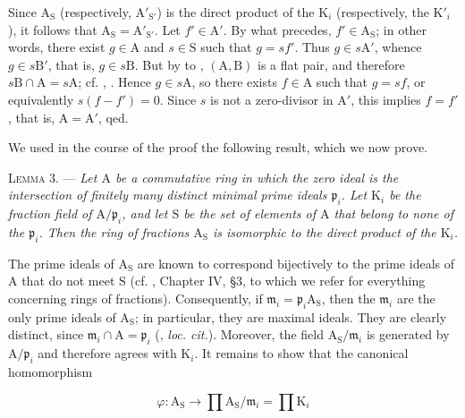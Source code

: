 Since $\mathrm{A}_\mathrm{S}$ (respectively, $\mathrm{A}'_{\mathrm{S}'}$) is the direct product of the $\mathrm{K}_i$ (respectively, the $\mathrm{K}'_i$), it follows that $\mathrm{A}_\mathrm{S}=\mathrm{A}'_{\mathrm{S}'}$. Let $f'\in \mathrm{A}'$. By what precedes, $f'\in \mathrm{A}_\mathrm{S}$; in other words, there exist $g\in \mathrm{A}$ and $s\in \mathrm{S}$ such that $g=sf'$. Thus $g\in s\mathrm{A}'$, whence $g\in s\mathrm{B}'$, that is, $g\in s\mathrm{B}$. But by  to , $(\mathrm{A},\mathrm{B})$ is a flat pair, and therefore $s\mathrm{B}\cap \mathrm{A}=s\mathrm{A}$; cf. , . Hence $g\in s\mathrm{A}$, so there exists $f\in \mathrm{A}$ such that $g=sf$, or equivalently $s(f-f')=0$. Since $s$ is not a zero-divisor in $\mathrm{A}'$, this implies $f=f'$, that is, $\mathrm{A}=\mathrm{A}'$, qed.

We used in the course of the proof the following result, which we now prove.

\textsc{Lemma 3}. --- \emph{Let $\mathrm{A}$ be a commutative ring in which the zero ideal is the intersection of finitely many distinct minimal prime ideals $\mathfrak{p}_i$. Let $\mathrm{K}_i$ be the fraction field of $\mathrm{A}/\mathfrak{p}_i$, and let $\mathrm{S}$ be the set of elements of $\mathrm{A}$ that belong to none of the $\mathfrak{p}_i$. Then the ring of fractions $\mathrm{A}_\mathrm{S}$ is isomorphic to the direct product of the $\mathrm{K}_i$.}

The prime ideals of $\mathrm{A}_\mathrm{S}$ are known to correspond bijectively to the prime ideals of $\mathrm{A}$ that do not meet $\mathrm{S}$ (cf. , Chapter IV, \S 3, to which we refer for everything concerning rings of fractions). Consequently, if $\mathfrak{m}_i=\mathfrak{p}_i\mathrm{A}_\mathrm{S}$, then the $\mathfrak{m}_i$ are the only prime ideals of $\mathrm{A}_\mathrm{S}$; in particular, they are maximal ideals. They are clearly distinct, since $\mathfrak{m}_i\cap \mathrm{A}=\mathfrak{p}_i$ (, \emph{loc. cit.}). Moreover, the field $\mathrm{A}_\mathrm{S}/\mathfrak{m}_i$ is generated by $\mathrm{A}/\mathfrak{p}_i$ and therefore agrees with $\mathrm{K}_i$. It remains to show that the canonical homomorphism

\begin{equation*}
\varphi:\mathrm{A}_\mathrm{S}\longrightarrow\prod \mathrm{A}_\mathrm{S}/\mathfrak{m}_i=\prod \mathrm{K}_i
\end{equation*}

